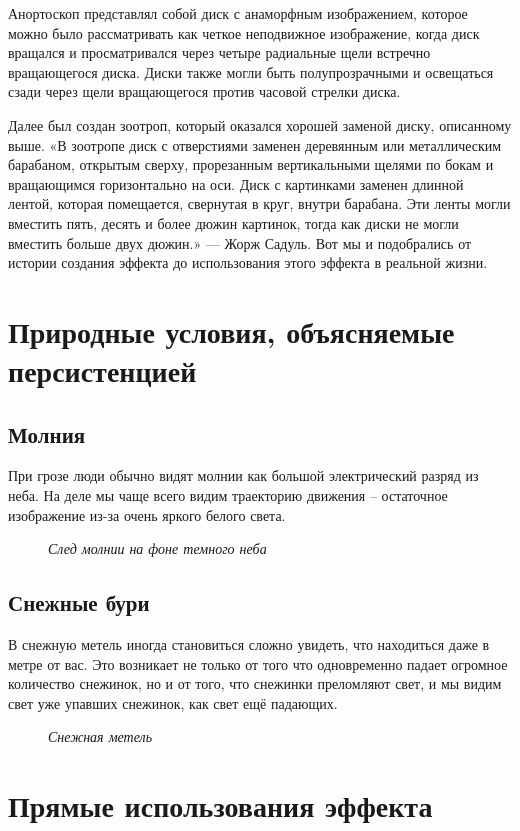 \documentclass[a4paper, 12pt]{article}
\newcommand{\image}[3]{
	\begin{figure}[ht]
		\center{\texttt{[image: img/\#1]} }
		\caption{\textit{#3}}\end{figure}
}
\begin{document}
Анортоскоп представлял собой диск с анаморфным изображением,
которое можно было рассматривать как четкое неподвижное
изображение, когда диск вращался и просматривался через четыре
радиальные щели встречно вращающегося диска. Диски также могли
быть полупрозрачными и освещаться сзади через щели вращающегося
против часовой стрелки диска.

Далее был создан зоотроп, который оказался хорошей заменой
диску, описанному выше. «В зоотропе диск с отверстиями заменен
деревянным или металлическим барабаном, открытым сверху,
прорезанным вертикальными щелями по бокам и вращающимся
горизонтально на оси. Диск с картинками заменен длинной лентой,
которая помещается, свернутая в круг, внутри барабана. Эти ленты
могли вместить пять, десять и более дюжин картинок, тогда как диски
не могли вместить больше двух дюжин.» — Жорж Садуль. Вот мы и
подобрались от истории создания эффекта до использования этого
эффекта в реальной жизни.

\newpage

\section{Природные условия, объясняемые персистенцией}

\subsection{Молния}

При грозе люди обычно видят молнии как большой электрический
разряд из неба. На деле мы чаще всего видим траекторию движения –
остаточное изображение из-за очень яркого белого света.

\image{Гроза.jpg}{230}{След молнии на фоне темного неба}

\subsection{Снежные бури}
В снежную метель иногда становиться сложно увидеть, что
находиться даже в метре от вас. Это возникает не только от того что
одновременно падает огромное количество снежинок, но и от того, что
снежинки преломляют свет, и мы видим свет уже упавших снежинок,
как свет ещё падающих.

\image{Снег.png}{230}{Снежная метель}

\newpage

\section{Прямые использования эффекта}
\end{document}
